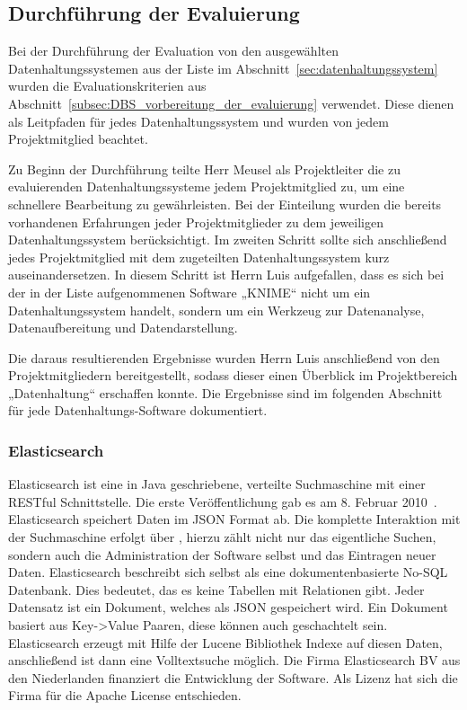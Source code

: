 \subsection{Durchführung der Evaluierung}
\label{subsec:durchfuehrung_der_evaluierung}
Bei der Durchführung der Evaluation von den ausgewählten Datenhaltungssystemen
aus der Liste im Abschnitt~\ref{sec:datenhaltungssystem} wurden die
Evaluationskriterien aus
Abschnitt~\ref{subsec:DBS_vorbereitung_der_evaluierung} verwendet. Diese
dienen als Leitpfaden für jedes Datenhaltungssystem und wurden von jedem
Projektmitglied beachtet.

Zu Beginn der Durchführung teilte Herr Meusel als Projektleiter die zu
evaluierenden Datenhaltungssysteme jedem Projektmitglied zu, um eine schnellere
Bearbeitung zu gewährleisten. Bei der Einteilung wurden die bereits vorhandenen
Erfahrungen jeder Projektmitglieder zu dem jeweiligen Datenhaltungssystem
berücksichtigt. Im zweiten Schritt sollte sich anschließend jedes
Projektmitglied mit dem zugeteilten Datenhaltungssystem kurz auseinandersetzen.
In diesem Schritt ist Herrn Luis aufgefallen, dass es sich bei der in der Liste
aufgenommenen Software „KNIME“ nicht um ein Datenhaltungssystem handelt,
sondern um ein Werkzeug zur Datenanalyse, Datenaufbereitung und
Datendarstellung.

Die daraus resultierenden Ergebnisse wurden Herrn Luis anschließend von den
Projektmitgliedern bereitgestellt, sodass dieser einen Überblick im
Projektbereich „Datenhaltung“ erschaffen konnte. Die Ergebnisse sind im
folgenden Abschnitt für jede Datenhaltungs\hyp{}Software dokumentiert.
\nl%

\subsubsection{Elasticsearch}
\label{subsubsec:elasticsearch}
Elasticsearch ist eine in Java geschriebene, verteilte Suchmaschine mit einer
\gls{RESTful} Schnittstelle. Die erste Veröffentlichung gab es am 8. Februar
2010~\cite{es_release}. Elasticsearch speichert Daten im \gls{JSON} Format ab.
Die komplette Interaktion mit der Suchmaschine erfolgt über
, hierzu zählt nicht nur das eigentliche Suchen, sondern
auch die Administration der Software selbst und das Eintragen neuer Daten.
Elasticsearch beschreibt sich selbst als eine dokumentenbasierte No\hyp{}SQL
Datenbank. Dies bedeutet, das es keine Tabellen mit Relationen gibt. Jeder
Datensatz ist ein Dokument, welches als \gls{JSON} gespeichert wird. Ein
Dokument basiert aus Key->Value Paaren, diese können auch geschachtelt sein.
Elasticsearch erzeugt mit Hilfe der \gls{Lucene} Bibliothek Indexe auf diesen
Daten, anschließend ist dann eine Volltextsuche möglich. Die Firma
Elasticsearch BV aus den Niederlanden finanziert die Entwicklung der Software.
Als Lizenz hat sich die Firma für die Apache License entschieden.

